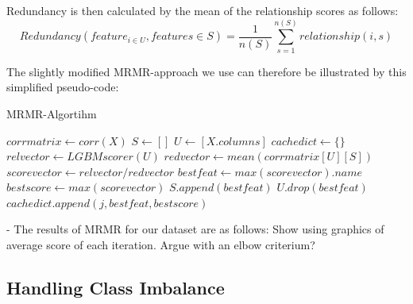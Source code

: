 \documentclass[12pt,titlepage]{article}
\begin{document}
Redundancy is then calculated by the mean of the relationship scores as follows: \\

\begin{equation} \label{redundancy}
    Redundancy(feature_{i \in U}, features \in S) = \frac{1}{n(S)} \sum_{s=1}^{n(S)} relationship(i, s)
\end{equation}

The slightly modified MRMR-approach we use can therefore be illustrated by this simplified pseudo-code: \\
\begin{algorithm}
\caption{MRMR-Algortihm}\label{alg:mrmr}
\begin{algorithmic}
    \State $corrmatrix \gets corr(X)$
    \State $S \gets \left[ \right]$
    \State $U \gets \left[X.columns\right]$
    \State $cachedict \gets \{\}$
        \State $relvector \gets LGBMscorer(U)$
        \State $redvector \gets mean(corrmatrix\left[U\right]\left[S\right])$
        \State $scorevector \gets relvector/redvector$
        \State $bestfeat \gets max(scorevector).name$
        \State $bestscore \gets max(scorevector)$
        \State $S.append(bestfeat)$
        \State $U.drop(bestfeat)$
        \State $cachedict.append(j,bestfeat, bestscore)$
    \EndFor
\end{algorithmic}
\end{algorithm}
- The results of MRMR for our dataset are as follows: Show using graphics of average score of each iteration. Argue with an elbow criterium? \\

\subsection{Handling Class Imbalance} \par
\end{document}
